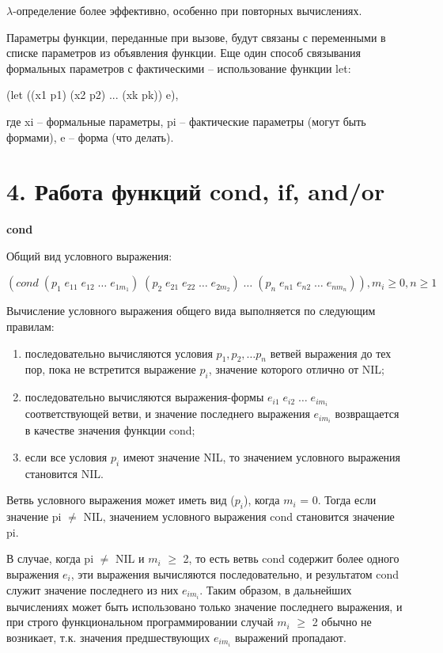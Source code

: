 \documentclass[12pt]{report}
\begin{document}
	$\lambda$-определение более эффективно, особенно при повторных вычислениях. 
	
	Параметры функции, переданные при вызове, будут связаны с переменными в списке параметров из объявления функции. Еще один способ связывания формальных параметров с фактическими -- использование функции let:
	
	(let ((x1 p1) (x2 p2) ... (xk pk))  e),
	
	где xi -- формальные параметры, pi -- фактические параметры (могут быть формами), e -- форма (что делать).
	
	\section*{4. Работа функций cond, if, and/or}
	
	\textbf{cond}
	
	Общий вид условного выражения:
	
	$(cond \; (p_1  \; e_{11}  \;  e_{12}  \;  …  \;  e_{1m_1})  \;  (p_2  \;  e_{21} \;  e_{22}  \;  …  \;  e_{2m_2})  \;  …  \;  (p_n  \; e_{n1} \;  e_{n2} \;  …  \; e_{nm_n})), m_i \geqslant 0 , n \geqslant 1$
	
	Вычисление условного выражения общего вида выполняется по  следующим правилам:
	
	\begin{enumerate}
		\item последовательно вычисляются условия $p_1, p_2, … p_n$ ветвей выражения до тех пор, пока не встретится выражение $p_i$, значение   которого отлично от NIL;
		\item последовательно вычисляются выражения-формы $e_{i1} \;  e_{i2} \;  … \;  e_{im_i}$ соответствующей ветви, и значение последнего выражения $e_{im_i}$ возвращается в качестве значения функции cond;
		\item если все условия $p_i$ имеют значение NIL, то значением условного выражения становится NIL.
	\end{enumerate}
	
	Ветвь условного выражения может иметь вид ($p_i$), когда $m_i$ = 0. Тогда если значение pi $\neq$ NIL, значением условного выражения cond становится значение pi.
	
	В случае, когда pi $\neq$ NIL и $m_i$ $\geqslant$ 2, то есть ветвь cond содержит более  одного выражения $e_i$, эти выражения вычисляются последовательно, и  результатом cond служит значение последнего из них $e_{im_i}$. Таким  образом, в дальнейших вычислениях может быть использовано только значение последнего выражения, и при строго функциональном  программировании случай $m_i$ $\geqslant$ 2 обычно не возникает, т.к. значения  предшествующих $e_{im_i}$ выражений пропадают. 
	
\end{document}
